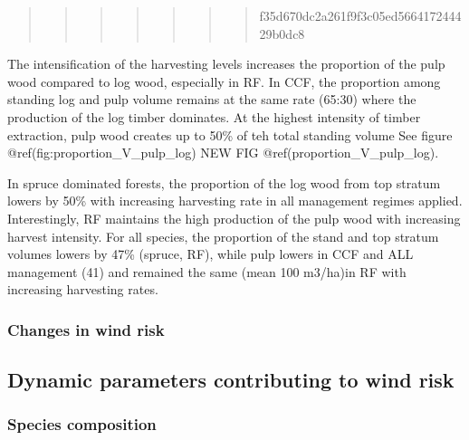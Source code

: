 \documentclass[]{elsarticle} %
\begin{document}
\begin{quote}
\begin{quote}
\begin{quote}
\begin{quote}
\begin{quote}
\begin{quote}
\begin{quote}
f35d670dc2a261f9f3c05ed566417244429b0dc8
\end{quote}
\end{quote}
\end{quote}
\end{quote}
\end{quote}
\end{quote}
\end{quote}

The intensification of the harvesting levels increases the proportion of
the pulp wood compared to log wood, especially in RF. In CCF, the
proportion among standing log and pulp volume remains at the same rate
(65:30) where the production of the log timber dominates. At the highest
intensity of timber extraction, pulp wood creates up to 50\% of teh
total standing volume See figure @ref(fig:proportion\_V\_pulp\_log) NEW
FIG @ref(proportion\_V\_pulp\_log).

In spruce dominated forests, the proportion of the log wood from top
stratum lowers by 50\% with increasing harvesting rate in all management
regimes applied. Interestingly, RF maintains the high production of the
pulp wood with increasing harvest intensity. For all species, the
proportion of the stand and top stratum volumes lowers by 47\% (spruce,
RF), while pulp lowers in CCF and ALL management (41) and remained the
same (mean 100 m3/ha)in RF with increasing harvesting rates.

\hypertarget{changes-in-wind-risk}{%
\subsubsection{Changes in wind risk}\label{changes-in-wind-risk}}

\hypertarget{dynamic-parameters-contributing-to-wind-risk}{%
\subsection{Dynamic parameters contributing to wind
risk}\label{dynamic-parameters-contributing-to-wind-risk}}

\hypertarget{species-composition}{%
\subsubsection{Species composition}\label{species-composition}}
\end{document}
